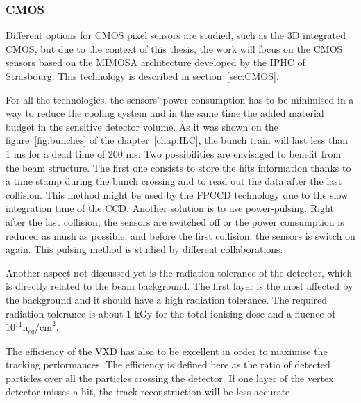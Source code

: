 
   \subsubsection{CMOS}

   Different options for \gls{CMOS} pixel sensors are studied, such as the 3D integrated \gls{CMOS}, but due to the context of this thesis, the work will focus on the \gls{CMOS} sensors based on the \gls{MIMOSA} architecture developed by the IPHC of Strasbourg. 
   This technology is described in section~\ref{sec:CMOS}.

   For all the technologies, the sensors' power consumption has to be minimised in a way to reduce the cooling system and in the same time the added material budget in the sensitive detector volume.
   As it was shown on the figure~\ref{fig:bunches} of the chapter~\ref{chap:ILC}, the bunch train will last less than 1 ms for a dead time of 200 ms.
   Two possibilities are envisaged to benefit from the beam structure.
   The first one consists to store the hits information thanks to a time stamp during the bunch crossing and to read out the data after the last collision.
   This method might be used by the \gls{FPCCD} technology due to the slow integration time of the \gls{CCD}.
   Another solution is to use power-pulsing.
   Right after the last collision, the sensors are switched off or the power consumption is reduced as mush as possible, and before the first collision, the sensors is switch on again.
   This pulsing method is studied by different collaborations. 
   
   Another aspect not discussed yet is the radiation tolerance of the detector, which is directly related to the beam background.
   The first layer is the most affected by the background and it should have a high radiation tolerance. 
   The required radiation tolerance is about 1 kGy for the total ionising dose and a fluence of $10^{11}\text{n}_{eq}\text{/cm}^2$\cite{Behnke2013}.

   The efficiency of the \gls{VXD} has also to be excellent in order to maximise the tracking performances.
   The efficiency is defined here as the ratio of detected particles over all the particles crossing the detector.
   If one layer of the vertex detector misses a hit, the track reconstruction will be less accurate 
   
